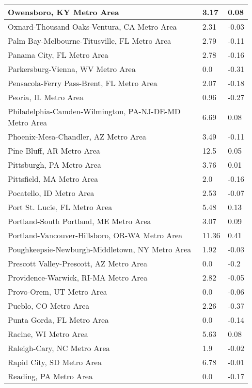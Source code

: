 \documentclass[12pt,oneside, letterpaper]{book}
\begin{document}
\begin{longtable}{| p{} | p{} | p{} |}
    Owensboro, KY Metro Area & 3.17 & 0.08 \\ \hline
    Oxnard-Thousand Oaks-Ventura, CA Metro Area & 2.31 & -0.03 \\ \hline
    Palm Bay-Melbourne-Titusville, FL Metro Area & 2.79 & -0.11 \\ \hline
    Panama City, FL Metro Area & 2.78 & -0.16 \\ \hline
    Parkersburg-Vienna, WV Metro Area & 0.0 & -0.31 \\ \hline
    Pensacola-Ferry Pass-Brent, FL Metro Area & 2.07 & -0.18 \\ \hline
    Peoria, IL Metro Area & 0.96 & -0.27 \\ \hline
    Philadelphia-Camden-Wilmington, PA-NJ-DE-MD Metro Area & 6.69 & 0.08 \\ \hline
    Phoenix-Mesa-Chandler, AZ Metro Area & 3.49 & -0.11 \\ \hline
    Pine Bluff, AR Metro Area & 12.5 & 0.05 \\ \hline
    Pittsburgh, PA Metro Area & 3.76 & 0.01 \\ \hline
    Pittsfield, MA Metro Area & 2.0 & -0.16 \\ \hline
    Pocatello, ID Metro Area & 2.53 & -0.07 \\ \hline
    Port St. Lucie, FL Metro Area & 5.48 & 0.13 \\ \hline
    Portland-South Portland, ME Metro Area & 3.07 & 0.09 \\ \hline
    Portland-Vancouver-Hillsboro, OR-WA Metro Area & 11.36 & 0.41 \\ \hline
    Poughkeepsie-Newburgh-Middletown, NY Metro Area & 1.92 & -0.03 \\ \hline
    Prescott Valley-Prescott, AZ Metro Area & 0.0 & -0.2 \\ \hline
    Providence-Warwick, RI-MA Metro Area & 2.82 & -0.05 \\ \hline
    Provo-Orem, UT Metro Area & 0.0 & -0.06 \\ \hline
    Pueblo, CO Metro Area & 2.26 & -0.37 \\ \hline
    Punta Gorda, FL Metro Area & 0.0 & -0.14 \\ \hline
    Racine, WI Metro Area & 5.63 & 0.08 \\ \hline
    Raleigh-Cary, NC Metro Area & 1.9 & -0.02 \\ \hline
    Rapid City, SD Metro Area & 6.78 & -0.01 \\ \hline
    Reading, PA Metro Area & 0.0 & -0.17 \\ \hline

\end{longtable}
\end{document}
